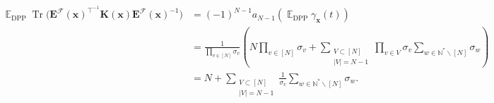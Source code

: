 \documentclass[twoside,11pt]{book}
\newtheorem{lemma}{Lemma}
\numberwithin{theorem}{chapter}
\numberwithin{definition}{chapter}
\numberwithin{proposition}{chapter}
\numberwithin{corollary}{chapter}
\numberwithin{example}{chapter}
\numberwithin{lemma}{chapter}
\numberwithin{assumption}{chapter}
\numberwithin{equation}{chapter}
\numberwithin{figure}{chapter}
\DeclareMathOperator{\Tr}{Tr}
\DeclareMathOperator{\Det}{Det}
\DeclareMathOperator{\DPP}{\mathrm{DPP}}
\DeclareMathOperator{\Tran}{\intercal}
\DeclareMathOperator{\EX}{\mathbb{E}}
\begin{document}
\begin{align}
\EX_{\DPP}  \Tr \bigg(  \bm{E}^{\mathcal{F}}(\bm{x})^{\Tran^{-1}}\bm{K}(\bm{x})\bm{E}^{\mathcal{F}}(\bm{x})^{-1} \bigg) & = (-1)^{N-1}a_{N-1}(\EX_{\DPP} \gamma_{\bm{x}}(t))\\
& = \frac{1}{\prod\limits_{v \in [N]}\sigma_{v}} \left( N\prod\limits_{v \in [N]}\sigma_{v} + \sum\limits_{\substack{V \subset [N]\\ |V| = N-1}} \prod\limits_{v \in V}\sigma_{v} \sum\limits_{w \in \mathbb{N}^{*}\smallsetminus [N]} \sigma_{w} \right) \nonumber\\
& =  N + \sum\limits_{\substack{V \subset [N]\\ |V| = N-1}} \frac{1}{\sigma_{v}} \sum\limits_{w \in \mathbb{N}^{*}\smallsetminus [N]} \sigma_{w} .
\end{align}






\end{document}
